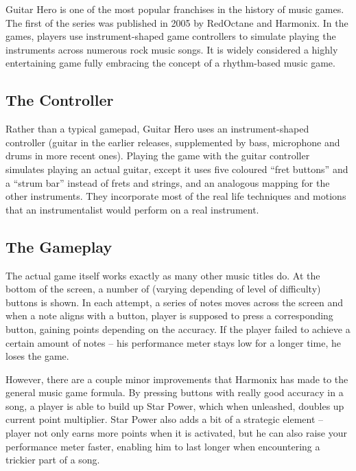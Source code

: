 Guitar Hero is one of the most popular franchises in the history of music games. The first of the series was published in 2005 by RedOctane and Harmonix. In the games, players use instrument-shaped game controllers to simulate playing the instruments across numerous rock music songs. It is widely considered a highly entertaining game fully embracing the concept of a rhythm-based music game.

\vspace{10pt}


\subsection*{The Controller}


Rather than a typical gamepad, Guitar Hero uses an instrument-shaped controller (guitar in the earlier releases, supplemented by bass, microphone and drums in more recent ones). Playing the game with the guitar controller simulates playing an actual guitar, except it uses five coloured ``fret buttons'' and a ``strum bar'' instead of frets and strings, and an analogous mapping for the other instruments. They incorporate most of the real life techniques and motions that an instrumentalist would perform on a real instrument.

\vspace{10pt}


\subsection*{The Gameplay}

The actual game itself works exactly as many other music titles do. At the bottom of the screen, a number of (varying depending of level of difficulty) buttons is shown. In each attempt, a series of notes moves across the screen and when a note aligns with a button, player is supposed to press a corresponding button, gaining points depending on the accuracy. If the player failed to achieve a certain amount of notes -- his performance meter stays low for a longer time, he loses the game.

However, there are a couple minor improvements that Harmonix has made to the general music game formula. By pressing buttons with really good accuracy in a song, a player is able to build up Star Power, which when unleashed, doubles up current point multiplier. Star Power also adds a bit of a strategic element -- player not only earns more points when it is activated, but he can also raise your performance meter faster, enabling him to last longer when encountering a trickier part of a song.

